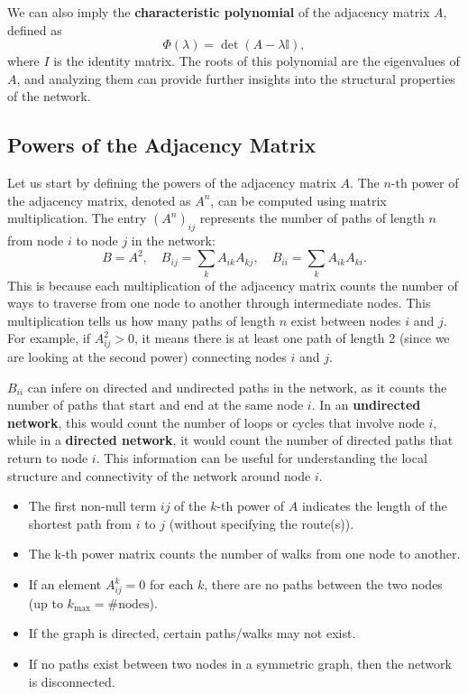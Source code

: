 We can also imply the \textbf{characteristic polynomial} of the adjacency matrix \(A\), defined as
\[
    \Phi(\lambda) = \det(A - \lambda \mathbb{I}),
\]
where \(I\) is the identity matrix. The roots of this polynomial are the eigenvalues of \(A\), and analyzing them can provide further insights into the structural properties of the network.

\subsection{Powers of the Adjacency Matrix}

Let us start by defining the powers of the adjacency matrix \(A\). The \(n\)-th power of the adjacency matrix, denoted as \(A^n\), can be computed using matrix multiplication. The entry \((A^n)_{ij}\) represents the number of paths of length \(n\) from node \(i\) to node \(j\) in the network:
\[
    B = A^2, \quad B_{ij} = \sum_{k} A_{ik} A_{kj}, \quad B_{ii} = \sum_{k} A_{ik} A_{ki}.
\]
This is because each multiplication of the adjacency matrix counts the number of ways to traverse from one node to another through intermediate nodes. This multiplication tells us how many paths of length \(n\) exist between nodes \(i\) and \(j\). For example, if \(A^2_{ij} > 0\), it means there is at least one path of length 2 (since we are looking at the second power) connecting nodes \(i\) and \(j\).

\(B_{ii}\) can infere on directed and undirected paths in the network, as it counts the number of paths that start and end at the same node \(i\). In an \textbf{undirected network}, this would count the number of loops or cycles that involve node \(i\), while in a \textbf{directed network}, it would count the number of directed paths that return to node \(i\). This information can be useful for understanding the local structure and connectivity of the network around node \(i\).

\begin{itemize}
    \item The first non-null term \(ij\) of the \(k\)-th power of \(A\) indicates the length of the shortest path from \(i\) to \(j\) (without specifying the route(s)).
    \item The k-th power matrix counts the number of walks from one node to another.
    \item If an element \(A^k_{ij} = 0\) for each \(k\), there are no paths between the two nodes (up to \(k_{\text{max}} = \#\text{nodes}\)).
    \item If the graph is directed, certain paths/walks may not exist.
    \item If no paths exist between two nodes in a symmetric graph, then the network is disconnected.
\end{itemize}

